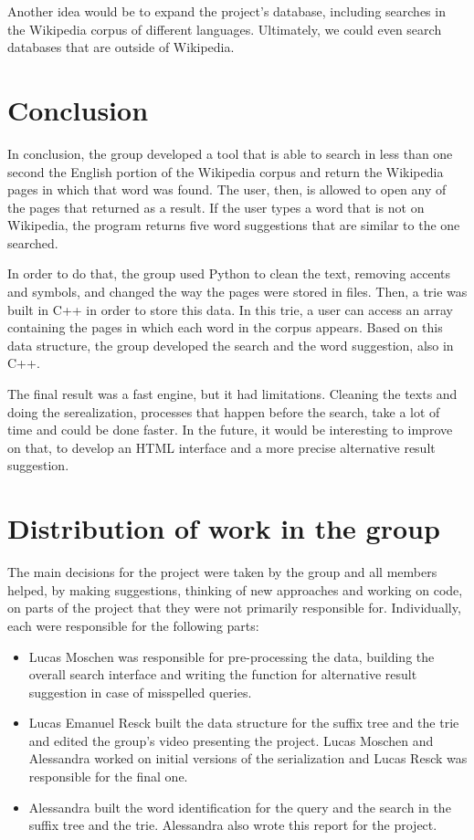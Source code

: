 \documentclass{article}
\begin{document}
Another idea would be to expand the project's database, including searches in the Wikipedia corpus of different languages. Ultimately, we could even search databases that are outside of Wikipedia. 

\section*{Conclusion}
In conclusion, the group developed a tool that is able to search in less than one second the English portion of the Wikipedia corpus and return the Wikipedia pages in which that word was found. The user, then, is allowed to open any of the pages that returned as a result. If the user types a word that is not on Wikipedia, the program returns five word suggestions that are similar to the one searched. 

In order to do that, the group used Python to clean the text, removing accents and symbols, and changed the way the pages were stored in files. Then, a trie was built in C++ in order to store this data. In this trie, a user can access an array containing the pages in which each word in the corpus appears. Based on this data structure, the group developed the search and the word suggestion, also in C++. 

The final result was a fast engine, but it had limitations. Cleaning the texts and doing the serealization, processes that happen before the search, take a lot of time and could be done faster. In the future, it would be interesting to improve on that, to develop an HTML interface and a more precise alternative result suggestion. 

\section*{Distribution of work in the group}
The main decisions for the project were taken by the group and all members helped, by making suggestions, thinking of new approaches and working on code, on parts of the project that they were not primarily responsible for. Individually, each were responsible for the following parts:

\begin{itemize}
    \item 
    Lucas Moschen was responsible for pre-processing the data, building the overall search interface and writing the function for alternative result suggestion in case of misspelled queries. 
    \item
    Lucas Emanuel Resck built the data structure for the suffix tree and the trie and edited the group's video presenting the project. Lucas Moschen and Alessandra worked on initial versions of the serialization and Lucas Resck was responsible for the final one. 
    \item
    Alessandra built the word identification for the query and the search in the suffix tree and the trie. Alessandra also wrote this report for the project. 

\end{itemize}
\end{document}
